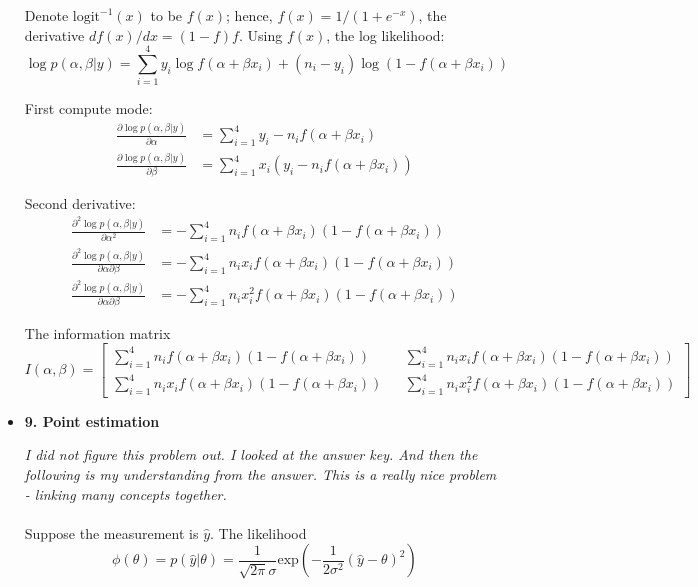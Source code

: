 \documentclass{article}
\begin{document}
\begin{itemize}
Denote $\text{logit}^{-1}(x)$ to be $f(x)$; hence, $f(x) = 1/\left(1 + e^{-x}\right)$, the derivative $df(x)/dx = (1 - f) f$. Using $f(x)$, the log likelihood:
$$
\log p(\alpha, \beta | y) = \sum_{i=1}^4 y_i \log f(\alpha + \beta x_i) + (n_i - y_i) \log \left (1 - f(\alpha + \beta x_i) \right)
$$

First compute mode:
\begin{align*}
  \frac{\partial \log p(\alpha, \beta | y)}{\partial \alpha} &= \sum_{i=1}^4 y_i - n_i f(\alpha + \beta x_i) \\
  \frac{\partial \log p(\alpha, \beta | y)}{\partial \beta} &= \sum_{i=1}^4 x_i(y_i - n_i f(\alpha + \beta x_i))
\end{align*}

Second derivative:
\begin{align}
  \frac{\partial^2 \log p(\alpha, \beta | y)}{\partial \alpha^2} &= -\sum_{i=1}^4 n_i f(\alpha + \beta x_i) \left ( 1 - f(\alpha + \beta x_i) \right ) \\
  \frac{\partial^2 \log p(\alpha, \beta | y)}{\partial \alpha \partial \beta} &= - \sum_{i=1}^4 n_i x_i f(\alpha + \beta x_i) ( 1 - f(\alpha + \beta x_i)) \\
  \frac{\partial^2 \log p(\alpha, \beta | y)}{\partial \alpha \partial \beta} &= - \sum_{i=1}^4 n_i x_i^2 f(\alpha + \beta x_i) (1 - f(\alpha + \beta x_i))
\end{align}

The information matrix
$$
I(\alpha, \beta) = \begin{bmatrix} \sum_{i=1}^4 n_i f(\alpha + \beta x_i) \left ( 1 - f(\alpha + \beta x_i) \right) && \sum_{i=1}^4 n_i x_i f(\alpha + \beta x_i) ( 1 - f(\alpha + \beta x_i)) \\ 
\sum_{i=1}^4 n_i x_i f(\alpha + \beta x_i) ( 1 - f(\alpha + \beta x_i)) &&  \sum_{i=1}^4 n_i x_i^2 f(\alpha + \beta x_i) (1 - f(\alpha + \beta x_i)) \end{bmatrix}
$$

\item \textbf{9. Point estimation}

  \textit{I did not figure this problem out. I looked at the answer key. And then the following is my understanding from the answer. This is a really nice problem - linking many concepts together.}
\\
\\
Suppose the measurement is $\hat y$. The likelihood
$$
\phi (\theta) = p(\hat y|\theta) = \frac{1}{\sqrt{2 \pi} \sigma} \text{exp} \left(-\frac{1}{2\sigma^2} (\hat y - \theta)^2 \right)
$$


\end{itemize}
\end{document}
